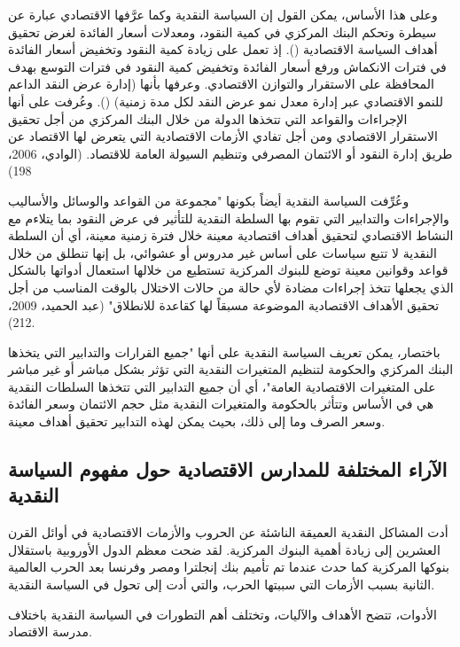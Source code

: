 \documentclass[10pt,a4paper]{report}
\begin{document}
\begin{doublespacing}
وعلى هذا الأساس، يمكن القول إن السياسة النقدية وكما عرَّفها الاقتصادي  عبارة عن سيطرة وتحكم البنك المركزي في كمية النقود، ومعدلات أسعار الفائدة لغرض تحقيق أهداف السياسة الاقتصادية (). إذ تعمل على زيادة كمية النقود وتخفيض أسعار الفائدة في فترات الانكماش ورفع أسعار الفائدة وتخفيض كمية النقود في فترات التوسع بهدف المحافظة على الاستقرار والتوازن الاقتصادي. وعرفها  بأنها (إدارة عرض النقد الداعم للنمو الاقتصادي عبر إدارة معدل نمو عرض النقد لكل مدة زمنية) (). وعُرفت على أنها الإجراءات والقواعد التي تتخذها الدولة من خلال البنك المركزي من أجل تحقيق الاستقرار الاقتصادي ومن أجل تفادي الأزمات الاقتصادية التي يتعرض لها الاقتصاد عن طريق إدارة النقود أو الائتمان المصرفي وتنظيم السيولة العامة للاقتصاد. (الوادي، 2006، 198)

وعُرِّفت السياسة النقدية أيضاً بكونها "مجموعة من القواعد والوسائل والأساليب والإجراءات والتدابير التي تقوم بها السلطة النقدية للتأثير في عرض النقود بما يتلاءم مع النشاط الاقتصادي لتحقيق أهداف اقتصادية معينة خلال فترة زمنية معينة، أي أن السلطة النقدية لا تتبع سياسات على أساس غير مدروس أو عشوائي، بل إنها تنطلق من خلال قواعد وقوانين معينة توضع للبنوك المركزية تستطيع من خلالها استعمال أدواتها بالشكل الذي يجعلها تتخذ إجراءات مضادة لأي حالة من حالات الاختلال بالوقت المناسب من أجل تحقيق الأهداف الاقتصادية الموضوعة مسبقاً لها كقاعدة للانطلاق" (عبد الحميد، 2009، 212).

باختصار، يمكن تعريف السياسة النقدية على أنها "جميع القرارات والتدابير التي يتخذها البنك المركزي والحكومة لتنظيم المتغيرات النقدية التي تؤثر بشكل مباشر أو غير مباشر على المتغيرات الاقتصادية العامة"، أي أن جميع التدابير التي تتخذها السلطات النقدية هي في الأساس وتتأثر بالحكومة والمتغيرات النقدية مثل حجم الائتمان وسعر الفائدة وسعر الصرف وما إلى ذلك، بحيث يمكن لهذه التدابير تحقيق أهداف معينة.
\clearpage
\subsection{الآراء المختلفة للمدارس الاقتصادية حول مفهوم السياسة النقدية}
أدت المشاكل النقدية العميقة الناشئة عن الحروب والأزمات الاقتصادية في أوائل القرن العشرين إلى زيادة أهمية البنوك المركزية. لقد ضحت معظم الدول الأوروبية باستقلال بنوكها المركزية كما حدث عندما تم تأميم بنك إنجلترا ومصر وفرنسا بعد الحرب العالمية الثانية بسبب الأزمات التي سببتها الحرب، والتي أدت إلى تحول في السياسة النقدية. 

الأدوات، تتضح الأهداف والآليات، وتختلف أهم التطورات في السياسة النقدية باختلاف مدرسة الاقتصاد.

\end{doublespacing}
\end{document}
